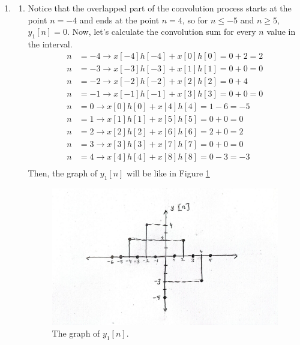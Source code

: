 \documentclass[10pt,a4paper, margin=1in]{article}
\begin{document}
\begin{enumerate}
\item %
	\begin{enumerate}
    \item %
    Notice that the overlapped part of the convolution process starts at the point $n=-4$ and ends at the point $n=4$, so for $n\leq -5$ and $n\geq 5$, $y_1[n]=0$. Now, let's calculate the convolution sum for every $n$ value in the interval.
    \begin{align*}
        n&=-4\rightarrow x[-4]h[-4]+x[0]h[0]=0+2=2 \\
        n&=-3\rightarrow x[-3]h[-3]+x[1]h[1]=0+0=0 \\
        n&=-2\rightarrow x[-2]h[-2]+x[2]h[2]=0+4 \\
        n&=-1\rightarrow x[-1]h[-1]+x[3]h[3]=0+0=0 \\
        n&=0\rightarrow x[0]h[0]+x[4]h[4]=1-6=-5 \\
        n&=1\rightarrow x[1]h[1]+x[5]h[5]=0+0=0 \\ 
        n&=2\rightarrow x[2]h[2]+x[6]h[6]=2+0=2 \\
        n&=3\rightarrow x[3]h[3]+x[7]h[7]=0+0=0 \\
        n&=4\rightarrow x[4]h[4]+x[8]h[8]=0-3=-3 \\
    \end{align*}
    Then, the graph of $y_1[n]$ will be like in Figure \ref{fig:q2a}
    \begin{figure}[htbp]
        \centering
            \includegraphics[scale=0.3]{q2a.jpg}
            \caption{The graph of $y_1[n]$.}
            \label{fig:q2a}
    \end{figure}
    

\end{enumerate}
\end{enumerate}
\end{document}

